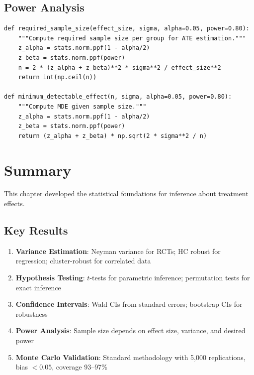 \subsection{Power Analysis}

\begin{verbatim}
def required_sample_size(effect_size, sigma, alpha=0.05, power=0.80):
    """Compute required sample size per group for ATE estimation."""
    z_alpha = stats.norm.ppf(1 - alpha/2)
    z_beta = stats.norm.ppf(power)
    n = 2 * (z_alpha + z_beta)**2 * sigma**2 / effect_size**2
    return int(np.ceil(n))

def minimum_detectable_effect(n, sigma, alpha=0.05, power=0.80):
    """Compute MDE given sample size."""
    z_alpha = stats.norm.ppf(1 - alpha/2)
    z_beta = stats.norm.ppf(power)
    return (z_alpha + z_beta) * np.sqrt(2 * sigma**2 / n)
\end{verbatim}


\section{Summary}
\label{sec:inference_summary}

This chapter developed the statistical foundations for inference about treatment effects.

\subsection{Key Results}

\begin{enumerate}
    \item \textbf{Variance Estimation}: Neyman variance for RCTs; HC robust for regression; cluster-robust for correlated data

    \item \textbf{Hypothesis Testing}: $t$-tests for parametric inference; permutation tests for exact inference

    \item \textbf{Confidence Intervals}: Wald CIs from standard errors; bootstrap CIs for robustness

    \item \textbf{Power Analysis}: Sample size depends on effect size, variance, and desired power

    \item \textbf{Monte Carlo Validation}: Standard methodology with 5,000 replications, bias $< 0.05$, coverage 93--97\%
\end{enumerate}

